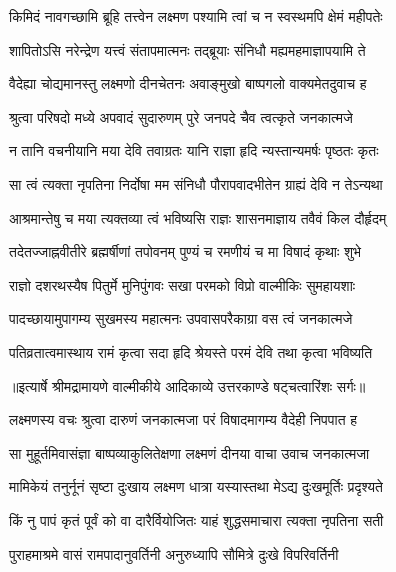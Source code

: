 \twolineshloka
{किमिदं नावगच्छामि ब्रूहि तत्त्वेन लक्ष्मण}
{पश्यामि त्वां च न स्वस्थमपि क्षेमं महीपतेः} %

\twolineshloka
{शापितोऽसि नरेन्द्रेण यत्त्वं संतापमात्मनः}
{तद्ब्रूयाः संनिधौ मह्यमहमाज्ञापयामि ते} %

\twolineshloka
{वैदेह्या चोद्यमानस्तु लक्ष्मणो दीनचेतनः}
{अवाङ्मुखो बाष्पगलो वाक्यमेतदुवाच ह} %

\twolineshloka
{श्रुत्वा परिषदो मध्ये अपवादं सुदारुणम्}
{पुरे जनपदे चैव त्वत्कृते जनकात्मजे} %

\twolineshloka
{न तानि वचनीयानि मया देवि तवाग्रतः}
{यानि राज्ञा हृदि न्यस्तान्यमर्षः पृष्ठतः कृतः} %

\twolineshloka
{सा त्वं त्यक्ता नृपतिना निर्दोषा मम संनिधौ}
{पौरापवादभीतेन ग्राह्यं देवि न तेऽन्यथा} %

\twolineshloka
{आश्रमान्तेषु च मया त्यक्तव्या त्वं भविष्यसि}
{राज्ञः शासनमाज्ञाय तवैवं किल दौर्हृदम्} %

\twolineshloka
{तदेतज्जाह्नवीतीरे ब्रह्मर्षीणां तपोवनम्}
{पुण्यं च रमणीयं च मा विषादं कृथाः शुभे} %

\twolineshloka
{राज्ञो दशरथस्यैष पितुर्मे मुनिपुंगवः}
{सखा परमको विप्रो वाल्मीकिः सुमहायशाः} %

\twolineshloka
{पादच्छायामुपागम्य सुखमस्य महात्मनः}
{उपवासपरैकाग्रा वस त्वं जनकात्मजे} %

\twolineshloka
{पतिव्रतात्वमास्थाय रामं कृत्वा सदा हृदि}
{श्रेयस्ते परमं देवि तथा कृत्वा भविष्यति} %


{॥इत्यार्षे श्रीमद्रामायणे वाल्मीकीये आदिकाव्ये उत्तरकाण्डे षट्चत्वारिंशः सर्गः॥}


\twolineshloka
{लक्ष्मणस्य वचः श्रुत्वा दारुणं जनकात्मजा}
{परं विषादमागम्य वैदेही निपपात ह} %

\twolineshloka
{सा मुहूर्तमिवासंज्ञा बाष्पव्याकुलितेक्षणा}
{लक्ष्मणं दीनया वाचा उवाच जनकात्मजा} %

\twolineshloka
{मामिकेयं तनुर्नूनं सृष्टा दुःखाय लक्ष्मण}
{धात्रा यस्यास्तथा मेऽद्य दुःखमूर्तिः प्रदृश्यते} %

\twolineshloka
{किं नु पापं कृतं पूर्वं को वा दारैर्वियोजितः}
{याहं शुद्धसमाचारा त्यक्ता नृपतिना सती} %

\twolineshloka
{पुराहमाश्रमे वासं रामपादानुवर्तिनी}
{अनुरुध्यापि सौमित्रे दुःखे विपरिवर्तिनी} %

